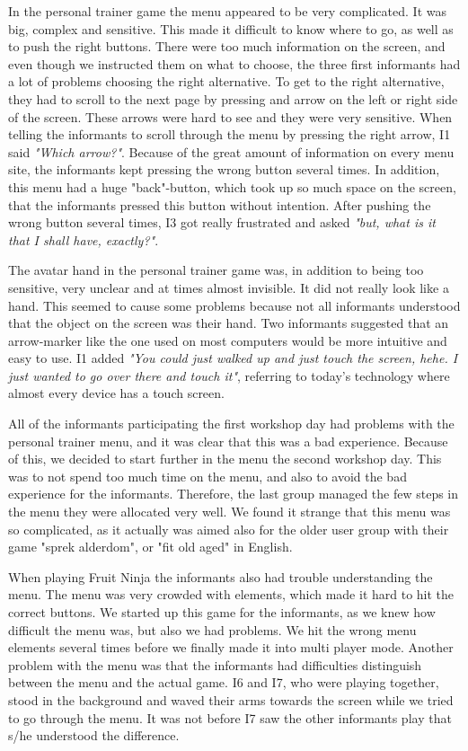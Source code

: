 In the personal trainer game the menu appeared to be very complicated. It was big, complex and sensitive. This made it difficult to know where to go, as well as to push the right buttons. There were too much information on the screen, and even though we instructed them on what to choose, the three first informants had a lot of problems choosing the right alternative. To get to the right alternative, they had to scroll to the next page by pressing and arrow on the left or right side of the screen. These arrows were hard to see and they were very sensitive. When telling the informants to scroll through the menu by pressing the right arrow, I1 said \emph{"Which arrow?"}. Because of the great amount of information on every menu site, the informants kept pressing the wrong button several times. In addition, this menu had a huge "back"-button, which took up so much space on the screen, that the informants pressed this button without intention. After pushing the wrong button several times, I3 got really frustrated and asked \emph{"but, what is it that I shall have, exactly?"}. 

The avatar hand in the personal trainer game was, in addition to being too sensitive, very unclear and at times almost invisible. It did not really look like a hand. This seemed to cause some problems because not all informants understood that the object on the screen was their hand. Two informants suggested that an arrow-marker like the one used on most computers would be more intuitive and easy to use. I1 added \emph{"You could just walked up and just touch the screen, hehe. I just wanted to go over there and touch it"}, referring to today's technology where almost every device has a touch screen.    

All of the informants participating the first workshop day had problems with the personal trainer menu, and it was clear that this was a bad experience. Because of this, we decided to start further in the menu the second workshop day. This was to not spend too much time on the menu, and also to avoid the bad experience for the informants. Therefore, the last group managed the few steps in the menu they were allocated very well. We found it strange that this menu was so complicated, as it actually was aimed also for the older user group with their game "sprek alderdom", or "fit old aged" in English. 

When playing Fruit Ninja the informants also had trouble understanding the menu. The menu was very crowded with elements, which made it hard to hit the correct buttons. We started up this game for the informants, as we knew how difficult the menu was, but also we had problems. We hit the wrong menu elements several times  before we finally made it into multi player mode. Another problem with the menu was that the informants had difficulties distinguish between the menu and the actual game. I6 and I7, who were playing together, stood in the background and waved their arms towards the screen while we tried to go through the menu. It was not before I7 saw the other informants play that s/he understood the difference. 

